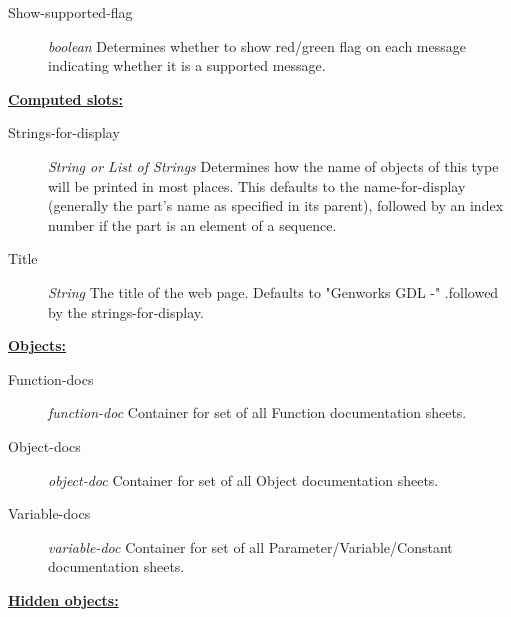 \documentclass [11pt]{book}
\begin{document}
\begin{itemize}
\begin{description}
\item [Show-supported-flag]
\emph{boolean} Determines whether to show red/green flag on each message indicating whether it is a
supported message.


\end{description}






\textbf{
\underline{Computed slots:}}

\begin{description}

\item [Strings-for-display]
\emph{String or List of Strings} Determines how the name of objects of this type will be printed in most places.
This defaults to the name-for-display (generally the part's name as specified in its
parent), followed by an index number if the part is an element of a sequence.


\item [Title]
\emph{String} The title of the web page. Defaults to "Genworks GDL -"
.followed by the strings-for-display.


\end{description}






\textbf{
\underline{Objects:}}

\begin{description}

\item [Function-docs]
\emph{function-doc} Container for set of all Function documentation sheets.


\item [Object-docs]
\emph{object-doc} Container for set of all Object documentation sheets.


\item [Variable-docs]
\emph{variable-doc} Container for set of all Parameter/Variable/Constant documentation sheets.


\end{description}






\textbf{
\underline{Hidden objects:}}


\end{itemize}
\end{document}

